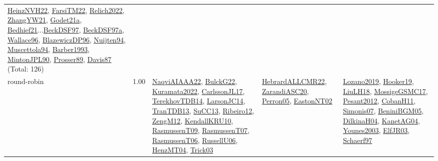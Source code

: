 {\begin{longtable}{p{3cm}r>{\raggedright\arraybackslash}p{6cm}>{\raggedright\arraybackslash}p{6cm}>{\raggedright\arraybackslash}p{8cm}}
\hyperref[detail:HeinzNVH22]{HeinzNVH22}, \hyperref[detail:FarsiTM22]{FarsiTM22}, \hyperref[detail:Relich2022]{Relich2022}, \hyperref[detail:ZhangYW21]{ZhangYW21}, \hyperref[detail:Godet21a]{Godet21a}, \hyperref[detail:Bedhief21]{Bedhief21}...\hyperref[detail:BeckDSF97]{BeckDSF97}, \hyperref[detail:BeckDSF97a]{BeckDSF97a}, \hyperref[detail:Wallace96]{Wallace96}, \hyperref[detail:BlazewiczDP96]{BlazewiczDP96}, \hyperref[detail:Nuijten94]{Nuijten94}, \hyperref[detail:Muscettola94]{Muscettola94}, \hyperref[detail:Barber1993]{Barber1993}, \hyperref[detail:MintonJPL90]{MintonJPL90}, \hyperref[detail:Prosser89]{Prosser89}, \hyperref[detail:Davis87]{Davis87} (Total: 126)\\
\index{round-robin}\index{ApplicationAreas!round-robin}round-robin &  1.00 & \hyperref[detail:NaqviAIAAA22]{NaqviAIAAA22}, \hyperref[detail:BulckG22]{BulckG22}, \hyperref[detail:Kuramata2022]{Kuramata2022}, \hyperref[detail:CarlssonJL17]{CarlssonJL17}, \hyperref[detail:TerekhovTDB14]{TerekhovTDB14}, \hyperref[detail:LarsonJC14]{LarsonJC14}, \hyperref[detail:TranTDB13]{TranTDB13}, \hyperref[detail:SuCC13]{SuCC13}, \hyperref[detail:Ribeiro12]{Ribeiro12}, \hyperref[detail:ZengM12]{ZengM12}, \hyperref[detail:KendallKRU10]{KendallKRU10}, \hyperref[detail:RasmussenT09]{RasmussenT09}, \hyperref[detail:RasmussenT07]{RasmussenT07}, \hyperref[detail:RasmussenT06]{RasmussenT06}, \hyperref[detail:RussellU06]{RussellU06}, \hyperref[detail:HenzMT04]{HenzMT04}, \hyperref[detail:Trick03]{Trick03} & \hyperref[detail:HebrardALLCMR22]{HebrardALLCMR22}, \hyperref[detail:ZarandiASC20]{ZarandiASC20}, \hyperref[detail:Perron05]{Perron05}, \hyperref[detail:EastonNT02]{EastonNT02} & \hyperref[detail:Lozano2019]{Lozano2019}, \hyperref[detail:Hooker19]{Hooker19}, \hyperref[detail:LiuLH18]{LiuLH18}, \hyperref[detail:MossigeGSMC17]{MossigeGSMC17}, \hyperref[detail:Pesant2012]{Pesant2012}, \hyperref[detail:CobanH11]{CobanH11}, \hyperref[detail:Simonis07]{Simonis07}, \hyperref[detail:BeniniBGM05]{BeniniBGM05}, \hyperref[detail:DilkinaH04]{DilkinaH04}, \hyperref[detail:KanetAG04]{KanetAG04}, \hyperref[detail:Younes2003]{Younes2003}, \hyperref[detail:ElfJR03]{ElfJR03}, \hyperref[detail:Schaerf97]{Schaerf97}\\

\end{longtable}}
